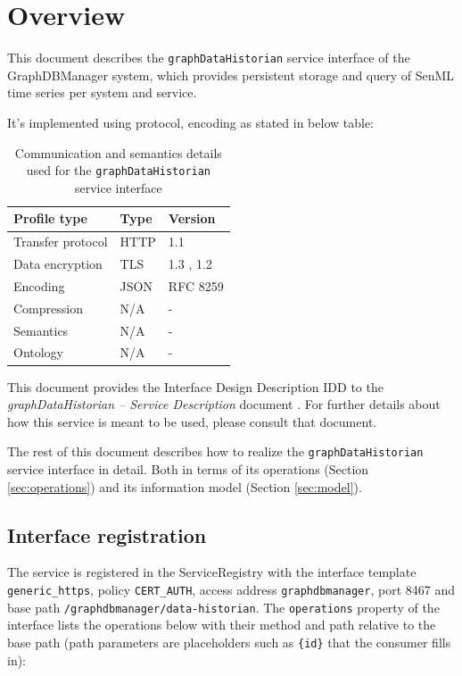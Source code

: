 \documentclass[a4paper]{arrowhead}
\begin{document}
\section{Overview}
\label{sec:overview}

This document describes the \texttt{graphDataHistorian} service interface of the GraphDBManager system, which provides persistent storage and query of SenML time series per system and service.

It's implemented using protocol, encoding as stated in below table:
\begin{table}[ht!]
  \centering
  \begin{tabular}{|l|l|l|}
    \hline
    \rowcolor{gray!33} Profile type & Type & Version \\ \hline
    Transfer protocol & HTTP & 1.1 \cite{rfc9112} \\ \hline
    Data encryption & TLS & 1.3 \cite{rfc8446}, 1.2 \cite{rfc5246} \\ \hline
    Encoding & JSON & RFC 8259 \cite{rfc8259} \\ \hline
    Compression & N/A & - \\ \hline
    Semantics & N/A & - \\ \hline
    Ontology & N/A & - \\ \hline
  \end{tabular}
  \caption{Communication and semantics details used for the \texttt{graphDataHistorian} service interface}
  \label{tab:comunication_semantics_profile}
\end{table}

This document provides the Interface Design Description IDD to the \textit{graphDataHistorian -- Service Description} document \cite{gdm-graphDataHistorian-sd}.
For further details about how this service is meant to be used, please consult that document.

The rest of this document describes how to realize the \texttt{graphDataHistorian} service
interface in detail. Both in terms of its operations (Section \ref{sec:operations}) and its information model (Section \ref{sec:model}).

\subsection{Interface registration}

The service is registered in the ServiceRegistry with the interface template \texttt{generic\_\allowbreak{}https}, policy \texttt{CERT\_\allowbreak{}AUTH}, access address \texttt{graphdbmanager}, port 8467 and base path \texttt{/\allowbreak{}graphdbmanager/\allowbreak{}data-\allowbreak{}historian}. The \texttt{operations} property of the interface lists the operations below with their method and path relative to the base path (path parameters are placeholders such as \texttt{\{id\}} that the consumer fills in):
\end{document}
